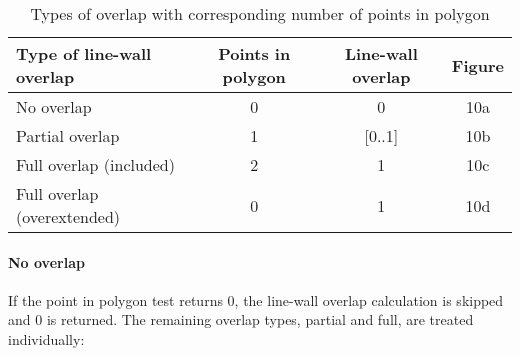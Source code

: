	\begin{table}[ht]
		\caption{Types of overlap with corresponding number of points in polygon}
		\label{tab:lwatypes}

		\begin{tabular}{|l||c|c|c|}
		\hline
		Type of line-wall overlap 			&	Points in polygon 			& Line-wall overlap & Figure \\
		\hline
		\hline
		No overlap					&	0					& 0		& 10a\\
		\hline
		Partial overlap 				&	1					& [0..1]	& 10b\\
		\hline
		Full overlap (included)		&	2					& 1		& 10c\\
		\hline
		Full overlap (overextended)		&  	0					& 1 		& 10d\\
		\hline
		\end{tabular}
	\end{table}

	\paragraph{No overlap}
	If the point in polygon test returns 0, the line-wall overlap calculation
	is skipped and 0 is returned. The remaining overlap types, partial and full,
	are treated individually:\\


